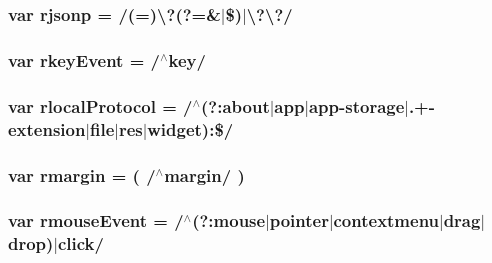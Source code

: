 \subsubsection[{\texorpdfstring{rjsonp}{rjsonp}}]{\setlength{\rightskip}{0pt plus 5cm}var rjsonp = /(=)\textbackslash{}?(?=\&$\vert$\$)$\vert$\textbackslash{}?\textbackslash{}?/}\hypertarget{jquery-3_82_81_8js_a8b62e46075611fd1fc0bbb78b14d113a}{}\label{jquery-3_82_81_8js_a8b62e46075611fd1fc0bbb78b14d113a}
\subsubsection[{\texorpdfstring{rkey\+Event}{rkeyEvent}}]{\setlength{\rightskip}{0pt plus 5cm}var rkey\+Event = /$^\wedge$key/}\hypertarget{jquery-3_82_81_8js_a6b448e96949bacadc060f81f9b7e5f2e}{}\label{jquery-3_82_81_8js_a6b448e96949bacadc060f81f9b7e5f2e}
\subsubsection[{\texorpdfstring{rlocal\+Protocol}{rlocalProtocol}}]{\setlength{\rightskip}{0pt plus 5cm}var rlocal\+Protocol = /$^\wedge$(?\+:about$\vert$app$\vert$app-\/storage$\vert$.+-\/extension$\vert$file$\vert$res$\vert$widget)\+:\$/}\hypertarget{jquery-3_82_81_8js_af4dd13c90298bbf53ce08ec707dc9e2a}{}\label{jquery-3_82_81_8js_af4dd13c90298bbf53ce08ec707dc9e2a}
\subsubsection[{\texorpdfstring{rmargin}{rmargin}}]{\setlength{\rightskip}{0pt plus 5cm}var rmargin = ( /$^\wedge$margin/ )}\hypertarget{jquery-3_82_81_8js_a8405fce45b4acb2530b583bb23224fbd}{}\label{jquery-3_82_81_8js_a8405fce45b4acb2530b583bb23224fbd}
\subsubsection[{\texorpdfstring{rmouse\+Event}{rmouseEvent}}]{\setlength{\rightskip}{0pt plus 5cm}var rmouse\+Event = /$^\wedge$(?\+:mouse$\vert$pointer$\vert$contextmenu$\vert$drag$\vert$drop)$\vert$click/}\hypertarget{jquery-3_82_81_8js_a9398fd419253e4dfc1706a744cf79ff8}{}\label{jquery-3_82_81_8js_a9398fd419253e4dfc1706a744cf79ff8}
